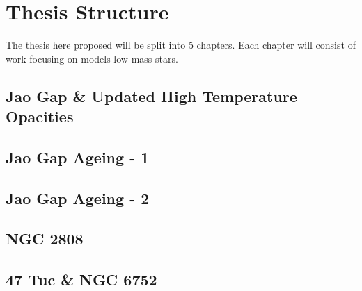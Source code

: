 \section{Thesis Structure}\label{sec:thesis}
The thesis here proposed will be split into 5 chapters. Each chapter will
consist of work focusing on models low mass stars.

\subsection{Jao Gap \& Updated High Temperature Opacities}\label{sec:p1}


\subsection{Jao Gap Ageing - 1}\label{sec:p2}


\subsection{Jao Gap Ageing - 2}\label{sec:p3}


\subsection{NGC 2808}\label{sec:p4}


\subsection{47 Tuc \& NGC 6752}\label{sec:p5}

